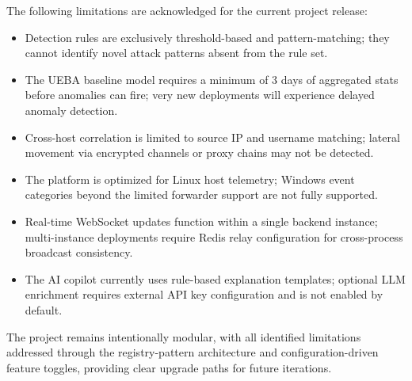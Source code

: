 The following limitations are acknowledged for the current project release:

\begin{itemize}
    \item Detection rules are exclusively threshold-based and pattern-matching; they cannot identify novel attack patterns absent from the rule set.
    \item The UEBA baseline model requires a minimum of 3 days of aggregated stats before anomalies can fire; very new deployments will experience delayed anomaly detection.
    \item Cross-host correlation is limited to source IP and username matching; lateral movement via encrypted channels or proxy chains may not be detected.
    \item The platform is optimized for Linux host telemetry; Windows event categories beyond the limited forwarder support are not fully supported.
    \item Real-time WebSocket updates function within a single backend instance; multi-instance deployments require Redis relay configuration for cross-process broadcast consistency.
    \item The AI copilot currently uses rule-based explanation templates; optional LLM enrichment requires external API key configuration and is not enabled by default.
\end{itemize}

The project remains intentionally modular, with all identified limitations addressed through the registry-pattern architecture and configuration-driven feature toggles, providing clear upgrade paths for future iterations.